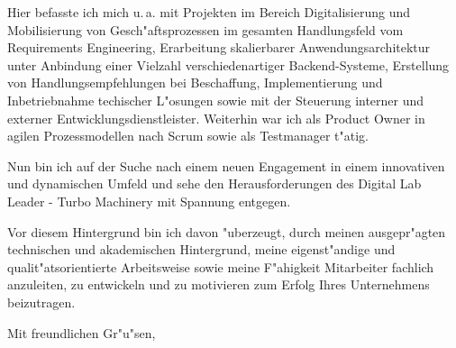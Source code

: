 \documentclass[11pt,a4paper]{dinbrief}
\begin{document}
\begin{letter}
Hier befasste ich mich u.\,a. mit Projekten im Bereich Digitalisierung und Mobilisierung von Gesch"aftsprozessen im gesamten Handlungsfeld vom Requirements Engineering, Erarbeitung skalierbarer Anwendungsarchitektur unter Anbindung einer Vielzahl verschiedenartiger Backend-Systeme, Erstellung von Handlungsempfehlungen bei Beschaffung, Implementierung und Inbetriebnahme techischer L"osungen sowie mit der Steuerung interner und externer Entwicklungsdienstleister. Weiterhin war ich als Product Owner in agilen Prozessmodellen nach Scrum sowie als Testmanager t"atig.

Nun bin ich auf der Suche nach einem neuen Engagement in einem innovativen und dynamischen Umfeld und sehe den Herausforderungen des Digital Lab Leader - Turbo Machinery mit Spannung entgegen.

Vor diesem Hintergrund bin ich davon "uberzeugt, durch meinen ausgepr"agten technischen und akademischen Hintergrund, meine eigenst"andige und qualit"atsorientierte Arbeitsweise sowie meine F"ahigkeit Mitarbeiter fachlich anzuleiten, zu entwickeln und zu motivieren zum Erfolg Ihres Unternehmens beizutragen.

\closing{Mit freundlichen Gr"u"sen,}
\end{letter}
\end{document}
